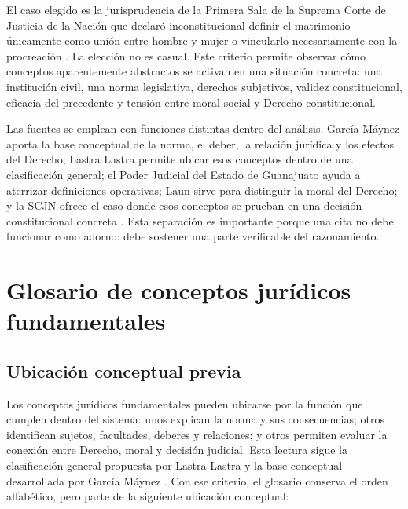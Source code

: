 \documentclass[
	spanish,
	letterpaper, oneside
]{article}
\begin{document}
El caso elegido es la jurisprudencia de la Primera Sala de la Suprema Corte de Justicia de la Nación que declaró inconstitucional definir el matrimonio únicamente como unión entre hombre y mujer o vincularlo necesariamente con la procreación \citep{scjnMatrimonio2015}. La elección no es casual. Este criterio permite observar cómo conceptos aparentemente abstractos se activan en una situación concreta: una institución civil, una norma legislativa, derechos subjetivos, validez constitucional, eficacia del precedente y tensión entre moral social y Derecho constitucional.

Las fuentes se emplean con funciones distintas dentro del análisis. García Máynez aporta la base conceptual de la norma, el deber, la relación jurídica y los efectos del Derecho; Lastra Lastra permite ubicar esos conceptos dentro de una clasificación general; el Poder Judicial del Estado de Guanajuato ayuda a aterrizar definiciones operativas; Laun sirve para distinguir la moral del Derecho; y la SCJN ofrece el caso donde esos conceptos se prueban en una decisión constitucional concreta \citep{garciaMaynez2002,lastraConceptosJuridicosFundamentales,poderJudicialGto2007,launDerechoMoral2021,scjnMatrimonio2015}. Esta separación es importante porque una cita no debe funcionar como adorno: debe sostener una parte verificable del razonamiento.

\section{Glosario de conceptos jurídicos fundamentales}

\subsection*{Ubicación conceptual previa}

Los conceptos jurídicos fundamentales pueden ubicarse por la función que cumplen dentro del sistema: unos explican la norma y sus consecuencias; otros identifican sujetos, facultades, deberes y relaciones; y otros permiten evaluar la conexión entre Derecho, moral y decisión judicial. Esta lectura sigue la clasificación general propuesta por Lastra Lastra \citep[pp.~400--403]{lastraConceptosJuridicosFundamentales} y la base conceptual desarrollada por García Máynez \citep{garciaMaynez2002}. Con ese criterio, el glosario conserva el orden alfabético, pero parte de la siguiente ubicación conceptual:
\end{document}
